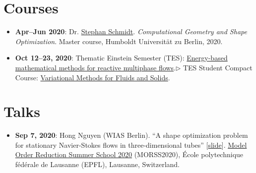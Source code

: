 \documentclass[onsided]{article}
\numberwithin{equation}{section}
\begin{document}
\section{Courses}
\begin{itemize}
    \item \textbf{Apr--Jun 2020}: Dr. \href{https://ifm.mathematik.uni-wuerzburg.de/~schmidt/}{Stephan Schmidt}. \textit{Computational Geometry and Shape Optimization}. Master course, Humboldt Universit\"at zu Berlin, 2020.
    \item \textbf{Oct 12--23, 2020}: Thematic Einstein Semester (TES): \href{https://mathplus.de/topic-development-lab/tes-winter-2020-21/}{Energy-based mathematical methods for reactive multiphase flows}.\newline $\triangleright$ TES Student Compact Course: \href{https://mathplus.de/topic-development-lab/tes-winter-2020-21/student-compact-course/}{Variational Methods for Fluids and Solids}.
\end{itemize}


\section{Talks}
\begin{itemize}
    \item \textbf{Sep 7, 2020}: Hong Nguyen (WIAS Berlin). ``A shape optimization problem for stationary Navier-Stokes flows in three-dimensional tubes'' [\href{https://zenodo.org/record/4117506}{slide}]. \href{https://morss2020.epfl.ch/}{Model Order Reduction Summer School 2020} (MORSS2020), \'Ecole polytechnique f\'ed\'erale de Lausanne (EPFL), Lausanne, Switzerland.
\end{itemize}


\printbibliography[heading=bibintoc]
\end{document}
